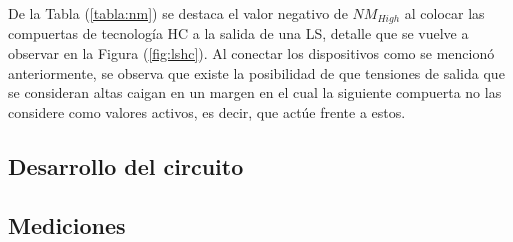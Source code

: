 De la Tabla (\ref{tabla:nm}) se destaca el valor negativo de $NM_{High}$ al colocar las compuertas de tecnología HC a la salida de una LS, detalle que se vuelve a observar en la Figura (\ref{fig:lshc}). Al conectar los dispositivos como se mencionó anteriormente, se observa que existe la posibilidad de que tensiones de salida que se consideran altas caigan en un margen en el cual la siguiente compuerta no las considere como valores activos, es decir, que actúe frente a estos.

\subsection{Desarrollo del circuito}

\subsection{Mediciones}


